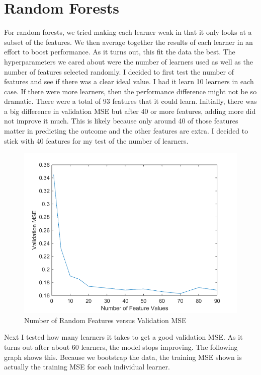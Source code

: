\documentclass[twoside,11pt]{article}
\theoremstyle{definition}
\begin{document}
\section*{Random Forests}

For random forests, we tried making each learner weak in that it only looks at a subset of the features. We then average together the results of each learner in an effort to boost performance. As it turns out, this fit the data the best. The hyperparameters we cared about were the number of learners used as well as the number of features selected randomly. I decided to first test the number of features and see if there was a clear ideal value. I had it learn 10 learners in each case. If there were more learners, then the performance difference might not be so dramatic. There were a total of 93 features that it could learn. Initially, there was a big difference in validation MSE but after 40 or more features, adding more did not improve it much. This is likely because only around 40 of those features matter in predicting the outcome and the other features are extra. I decided to stick with 40 features for my test of the number of learners. \\

\begin{figure}[h!]
\centering
\includegraphics[width=4 in]{numFeatValuesVersusMSE.png}
\caption{Number of Random Features versus Validation MSE}
\end{figure}

Next I tested how many learners it takes to get a good validation MSE. As it turns out after about 60 learners, the model stops improving. The following graph shows this. Because we bootstrap the data, the training MSE shown is actually the training MSE for each individual learner. \\
\end{document}
